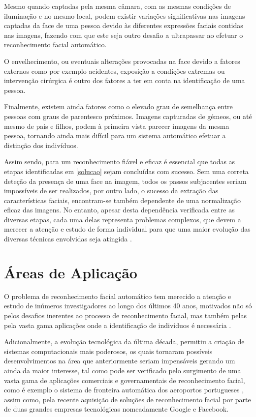 Mesmo quando captadas pela mesma câmara, com as mesmas condições de iluminação e no mesmo local, podem existir variações significativas nas imagens captadas da face de uma pessoa devido às diferentes expressões faciais contidas nas imagens, fazendo com que este seja outro desafio a ultrapassar ao efetuar o reconhecimento facial automático.

O envelhecimento, ou eventuais alterações provocadas na face devido a fatores externos como por exemplo acidentes, exposição a condições extremas ou intervenção cirúrgica é outro dos fatores a ter em conta na identificação de uma pessoa.

Finalmente, existem ainda fatores como o elevado grau de semelhança entre pessoas com graus de parentesco próximos. Imagens capturadas de gémeos, ou até mesmo de pais e filhos, podem à primeira vista parecer imagens da mesma pessoa, tornando ainda mais difícil para um sistema automático efetuar a distinção dos indivíduos.

Assim sendo, para um reconhecimento fiável e eficaz é essencial que todas as etapas identificadas em \ref{solucao} sejam concluídas com sucesso. Sem uma correta deteção da presença de uma face na imagem, todos os passos subjacentes seriam impossíveis de ser realizados, por outro lado, o sucesso da extração das características faciais, encontram-se também dependente de uma normalização eficaz das imagens. No entanto, apesar desta dependência verificada entre as diversas etapas, cada uma delas representa problemas complexos, que devem a merecer a atenção e estudo de forma individual para que uma maior evolução das diversas técnicas envolvidas seja atingida \citep{Zhao2003}.


\section{Áreas de Aplicação}\label{sec:areasaplicacao}
O problema de reconhecimento facial automático tem merecido a atenção e estudo de inúmeros investigadores ao longo dos últimos 40 anos, motivados não só pelos desafios inerentes ao processo de reconhecimento facial, mas também pelas pela vasta gama aplicações onde a identificação de indivíduos é necessária \citep{Li2011}.

Adicionalmente, a evolução tecnológica da última década, permitiu a criação de sistemas computacionais mais poderosos, os quais tornaram possíveis desenvolvimentos na área que anteriormente seriam impensáveis gerando um ainda da maior interesse, tal como pode ser verificado pelo surgimento de uma vasta gama de aplicações comerciais e governamentais de reconhecimento facial, como é exemplo o sistema de fronteira automática dos aeroportos portugueses \citep{MinisteriodaAdministracaoInternaa}, assim como, pela recente aquisição de soluções de reconhecimento facial \cite{refGoogle, refFacebook} por parte de duas grandes empresas tecnológicas nomeadamente Google e Facebook.

